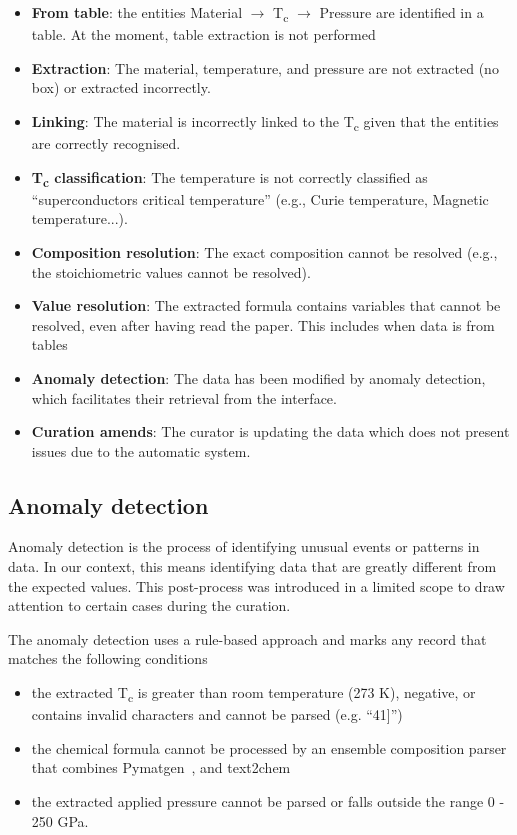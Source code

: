 \begin{itemize}
    \item \textbf{From table}: the entities Material $\rightarrow$ T\textsubscript{c} $\rightarrow$ Pressure are identified in a table. At the moment, table extraction is not performed
    \item \textbf{Extraction}: The material, temperature, and pressure are not extracted (no box) or extracted incorrectly. 
    \item \textbf{Linking}: The material is incorrectly linked to the T\textsubscript{c} given that the entities are correctly recognised.
    \item \textbf{T\textsubscript{c} classification}: The temperature is not correctly classified as ``superconductors critical temperature'' (e.g., Curie temperature, Magnetic temperature...).
    \item \textbf{Composition resolution}: The exact composition cannot be resolved (e.g., the stoichiometric values cannot be resolved).
    \item \textbf{Value resolution}: The extracted formula contains variables that cannot be resolved, even after having read the paper. This includes when data is from tables
    \item \textbf{Anomaly detection}: The data has been modified by anomaly detection, which facilitates their retrieval from the interface.
    \item \textbf{Curation amends}: The curator is updating the data which does not present issues due to the automatic system.
\end{itemize}

\subsection{Anomaly detection}
\label{subsec:anomaly-detection}
Anomaly detection is the process of identifying unusual events or patterns in data. 
In our context, this means identifying data that are greatly different from the expected values.
This post-process was introduced in a limited scope to draw attention to certain cases during the curation.

The anomaly detection uses a rule-based approach and marks any record that matches the following conditions
\begin{itemize}
    \item the extracted T\textsubscript{c} is greater than room temperature (273 K), negative, or contains invalid characters and cannot be parsed (e.g. ``41]'')
    \item the chemical formula cannot be processed by an ensemble composition parser that combines Pymatgen~\cite{Ong2013}, and text2chem~\cite{kononova2019text} 
    \item the extracted applied pressure cannot be parsed or falls outside the range 0 - 250 GPa.
\end{itemize}

